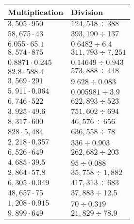 \begin{longtable}[]{@{}ll@{}}
\toprule
Multiplication & Division\tabularnewline
\midrule
\endhead
\(3,505\cdot950\) & \(124,548÷388\)\tabularnewline
\(58,675\cdot43\) & \(393,190÷137\)\tabularnewline
\(6.055\cdot65.1\) & \(0.6482÷6.4\)\tabularnewline
\(8,574\cdot875\) & \(311,793÷7,251\)\tabularnewline
\(0.8871\cdot0.245\) & \(0.14649÷0.943\)\tabularnewline
\(82.8\cdot588.4\) & \(573,888÷448\)\tabularnewline
\(3,569\cdot291\) & \(9.628÷0.083\)\tabularnewline
\(5,911\cdot0.064\) & \(0.005981÷3.9\)\tabularnewline
\(6,746\cdot522\) & \(622,893÷523\)\tabularnewline
\(3,925\cdot49.6\) & \(751,602÷694\)\tabularnewline
\(8,317\cdot600\) & \(46,576÷656\)\tabularnewline
\(828\cdot5,484\) & \(636,558÷78\)\tabularnewline
\(2,218\cdot0.357\) & \(336÷0.903\)\tabularnewline
\(6,526\cdot649\) & \(262,682÷203\)\tabularnewline
\(4,685\cdot39.5\) & \(95÷0.088\)\tabularnewline
\(2,864\cdot57.8\) & \(35,758÷1,882\)\tabularnewline
\(6,305\cdot0.049\) & \(417,313÷683\)\tabularnewline
\(48,657\cdot75\) & \(37,883÷12.5\)\tabularnewline
\(1,208\cdot0.915\) & \(70÷0.319\)\tabularnewline
\(9,899\cdot649\) & \(21,829÷78.9\)\tabularnewline
\bottomrule
\end{longtable}
